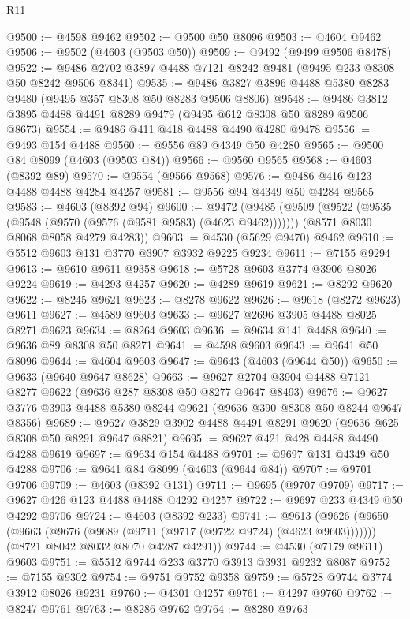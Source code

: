 \begin{lexlean}{R11}
\begin{coremodule}
@9500 := @4598 @9462
@9502 := @9500 @50 @8096
@9503 := @4604 @9462
@9506 := @9502 (@4603 (@9503 @50))
@9509 := @9492 (@9499 @9506 @8478)
@9522 := @9486 @2702 @3897 @4488 @7121 @8242 @9481 (@9495 @233 @8308 @50 @8242 @9506 @8341)
@9535 := @9486 @3827 @3896 @4488 @5380 @8283 @9480 (@9495 @357 @8308 @50 @8283 @9506 @8806)
@9548 := @9486 @3812 @3895 @4488 @4491 @8289 @9479 (@9495 @612 @8308 @50 @8289 @9506 @8673)
@9554 := @9486 @411 @418 @4488 @4490 @4280 @9478
@9556 := @9493 @154 @4488
@9560 := @9556 @89 @4349 @50 @4280
@9565 := @9500 @84 @8099 (@4603 (@9503 @84))
@9566 := @9560 @9565
@9568 := @4603 (@8392 @89)
@9570 := @9554 (@9566 @9568)
@9576 := @9486 @416 @123 @4488 @4488 @4284 @4257
@9581 := @9556 @94 @4349 @50 @4284 @9565
@9583 := @4603 (@8392 @94)
@9600 := @9472
    (@9485
      (@9509 (@9522 (@9535 (@9548 (@9570 (@9576 (@9581 @9583) (@4623 @9462)))))))
      (@8571 @8030 @8068 @8058 @4279 @4283))
@9603 := @4530 (@5629 @9470) @9462
@9610 := @5512 @9603 @131 @3770 @3907 @3932 @9225 @9234
@9611 := @7155 @9294
@9613 := @9610 @9611 @9358
@9618 := @5728 @9603 @3774 @3906 @8026 @9224
@9619 := @4293 @4257
@9620 := @4289 @9619
@9621 := @8292 @9620
@9622 := @8245 @9621
@9623 := @8278 @9622
@9626 := @9618 (@8272 @9623) @9611
@9627 := @4589 @9603
@9633 := @9627 @2696 @3905 @4488 @8025 @8271 @9623
@9634 := @8264 @9603
@9636 := @9634 @141 @4488
@9640 := @9636 @89 @8308 @50 @8271
@9641 := @4598 @9603
@9643 := @9641 @50 @8096
@9644 := @4604 @9603
@9647 := @9643 (@4603 (@9644 @50))
@9650 := @9633 (@9640 @9647 @8628)
@9663 := @9627 @2704 @3904 @4488 @7121 @8277 @9622 (@9636 @287 @8308 @50 @8277 @9647 @8493)
@9676 := @9627 @3776 @3903 @4488 @5380 @8244 @9621 (@9636 @390 @8308 @50 @8244 @9647 @8356)
@9689 := @9627 @3829 @3902 @4488 @4491 @8291 @9620 (@9636 @625 @8308 @50 @8291 @9647 @8821)
@9695 := @9627 @421 @428 @4488 @4490 @4288 @9619
@9697 := @9634 @154 @4488
@9701 := @9697 @131 @4349 @50 @4288
@9706 := @9641 @84 @8099 (@4603 (@9644 @84))
@9707 := @9701 @9706
@9709 := @4603 (@8392 @131)
@9711 := @9695 (@9707 @9709)
@9717 := @9627 @426 @123 @4488 @4488 @4292 @4257
@9722 := @9697 @233 @4349 @50 @4292 @9706
@9724 := @4603 (@8392 @233)
@9741 := @9613
    (@9626
      (@9650 (@9663 (@9676 (@9689 (@9711 (@9717 (@9722 @9724) (@4623 @9603)))))))
      (@8721 @8042 @8032 @8070 @4287 @4291))
@9744 := @4530 (@7179 @9611) @9603
@9751 := @5512 @9744 @233 @3770 @3913 @3931 @9232 @8087
@9752 := @7155 @9302
@9754 := @9751 @9752 @9358
@9759 := @5728 @9744 @3774 @3912 @8026 @9231
@9760 := @4301 @4257
@9761 := @4297 @9760
@9762 := @8247 @9761
@9763 := @8286 @9762
@9764 := @8280 @9763

\end{coremodule}
\end{lexlean}
